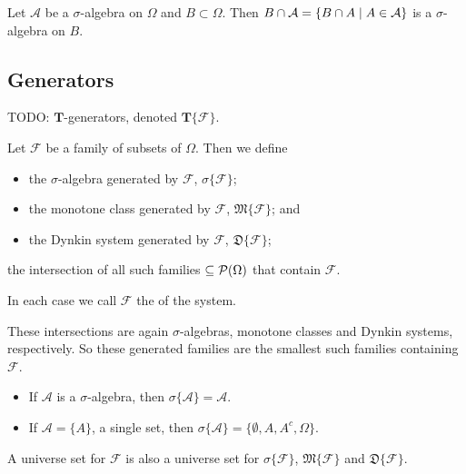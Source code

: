 \begin{lemma}
Let $\mathcal{A}$ be a $\sigma$-algebra on $\Omega$ and $B\subset \Omega$. Then $B\cap \mathcal{A} = \left\{ B\cap A \;\middle|\; A\in\mathcal{A} \right\}$ is a $\sigma$-algebra on $B$.
\end{lemma}

\subsection{Generators}
TODO: $\boldsymbol{T}$-generators, denoted $\boldsymbol{T}\{\mathcal{F}\}$.
\begin{definition}
Let $\mathcal{F}$ be a family of subsets of $\Omega$. Then we define
\begin{itemize}
\item the $\sigma$-algebra generated by $\mathcal{F}$, $\sigma\{\mathcal{F}\}$;
\item the monotone class generated by $\mathcal{F}$, $\mathfrak{M}\{\mathcal{F}\}$; and
\item the Dynkin system generated by $\mathcal{F}$, $\mathfrak{D}\{\mathcal{F}\}$;
\end{itemize}
the intersection of all such families $\subseteq \operatorname{\mathcal{P}}(\Omega)$ that contain $\mathcal{F}$.

In each case we call $\mathcal{F}$ the  of the system.
\end{definition}
These intersections are again $\sigma$-algebras, monotone classes and Dynkin systems, respectively. So these generated families are the smallest such families containing $\mathcal{F}$.

\begin{example}
\begin{itemize}
\item If $\mathcal{A}$ is a $\sigma$-algebra, then $\sigma\{\mathcal{A}\} = \mathcal{A}$.
\item If $\mathcal{A} = \{A\}$, a single set, then $\sigma\{\mathcal{A}\} = \{\emptyset, A,A^c,\Omega\}$.
\end{itemize}
\end{example}

\begin{lemma} \label{unitGeneratedSets}
A universe set for $\mathcal{F}$ is also a universe set for $\sigma\{\mathcal{F}\}$, $\mathfrak{M}\{\mathcal{F}\}$ and $\mathfrak{D}\{\mathcal{F}\}$.
\end{lemma}

